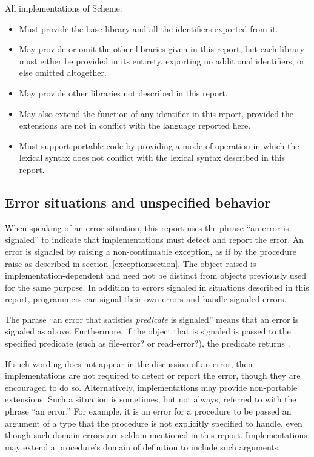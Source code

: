 All implementations of Scheme:
\begin{itemize}

\item Must provide the base library and all the identifiers
exported from it.

\item May provide or omit the other
libraries given in this report, but each library must either be provided
in its entirety, exporting no additional identifiers, or else omitted
altogether.

\item May provide other libraries not described in this report.

\item May also extend the function of any identifier in this
report, provided the extensions are not in conflict with the language
reported here.

\item Must support portable
code by providing a mode of operation in which the lexical syntax does
not conflict with the lexical syntax described in this report.
\end{itemize}

\subsection{Error situations and unspecified behavior}
\label{errorsituations}

When speaking of an error situation, this report uses the phrase ``an
error is signaled'' to indicate that implementations must detect and
report the error.
An error is signaled by raising a non-continuable exception, as if by
the procedure {\cf raise} as described in section~\ref{exceptionsection}.  The object raised is implementation-dependent
and need not be distinct from objects previously used for the same purpose.
In addition to errors signaled in situations described in this
report, programmers can signal their own errors and handle signaled errors.

The phrase ``an error that satisfies {\em predicate} is signaled'' means that an error is
signaled as above.  Furthermore, if the object that is signaled is
passed to the specified predicate (such as {\cf file-error?} or {\cf
read-error?}), the predicate returns \schtrue{}.

\vest If such wording does not appear in the discussion of
an error, then implementations are not required to detect or report the
error, though they are encouraged to do so.
Alternatively, implementations may provide non-portable extensions.
Such a situation is sometimes, but not always, referred to with the phrase
``an error.''
For example, it is an error for a procedure to be passed an argument of a type that
the procedure is not explicitly specified to handle, even though such
domain errors are seldom mentioned in this report.  Implementations may
extend a procedure's domain of definition to include such arguments.


